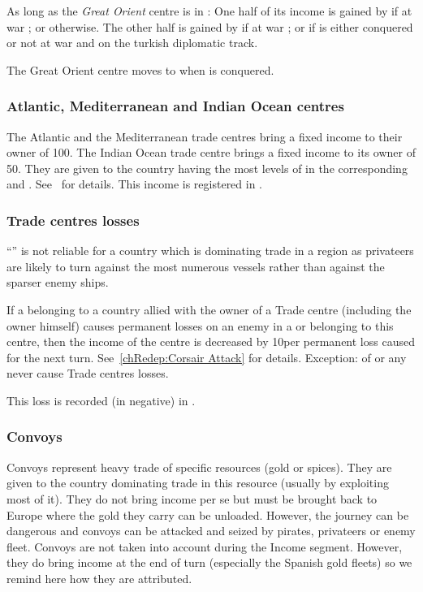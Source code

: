 \aparag As long as the \emph{Great Orient} centre is in :
\bparag One half of its income is gained by \paysEgypte if at war ; or \VEN
otherwise.
\bparag The other half is gained by \paysDamas if at war ; or \TUR if
\paysDamas is either conquered or not at war and on the turkish
diplomatic track.

\aparag The Great Orient centre moves to \TUR when \paysEgypte is
conquered.

\subsubsection{Atlantic, Mediterranean and Indian Ocean centres}\label{chIncomes:Trade Centres}
\aparag The Atlantic and the Mediterranean trade centres bring a fixed
income to their owner of 100\ducats.
\bparag The Indian Ocean trade centre brings a fixed income to its owner
of 50\ducats.
\bparag They are given to the country having the most levels of
\TradeFLEET in the corresponding \STZ and \CTZ.
See~ for details.
\bparag This income is registered in .

\subsubsection{Trade centres losses}
\aparag ``'' is not reliable for a country which
is dominating trade in a region as privateers are likely to turn against
the most numerous vessels rather than against the sparser enemy ships.

\aparag If a \corsaire belonging to a country allied with the owner of
a Trade centre (including the owner himself) causes permanent losses on
an enemy \TradeFLEET in a \STZ or \CTZ belonging to this centre, then
the income of the centre is decreased by 10\ducats per permanent loss
caused for the next turn.
\bparag See~\ref{chRedep:Corsair Attack} for details.
\bparag Exception: \corsaire of \paysChevaliers or any \Barbaresques
never cause Trade centres losses.

\aparag This loss is recorded (in negative) in .

\subsubsection{Convoys}
\aparag Convoys represent heavy trade of specific resources (gold or
spices). They are given to the country dominating trade in this resource
(usually by exploiting most of it). They do not bring income per se but
must be brought back to Europe where the gold they carry can be
unloaded. However, the journey can be dangerous and convoys can be
attacked and seized by pirates, privateers or enemy fleet.
\bparag Convoys are not taken into account during the Income
segment. However, they do bring income at the end of turn (especially
the Spanish gold fleets) so we remind here how they are
attributed.

